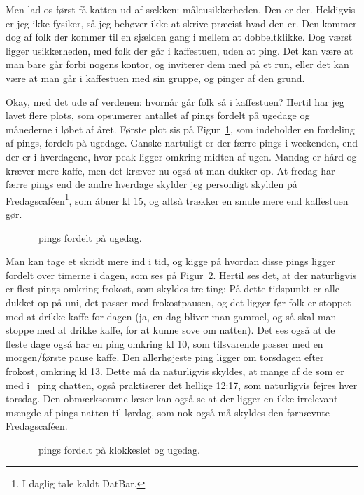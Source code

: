\documentclass{article}
\newlength\myheight
\newlength\mydepth
\newcommand*\inlinegraphics[1]{%
  \settototalheight\myheight{Xygp}%
  \settodepth\mydepth{Xygp}%
  \raisebox{-\mydepth}{\texttt{[image: \#1]}}%
}
\newcommand{\coffee}[0]{\inlinegraphics{coffee.png}}
\begin{document}
Men lad os først få katten ud af sækken: måleusikkerheden. Den er der. Heldigvis er jeg ikke fysiker, så jeg behøver ikke at skrive præcist hvad den er. Den kommer dog af folk der kommer til en sjælden gang i mellem at dobbeltklikke. Dog værst ligger usikkerheden, med folk der går i kaffestuen, uden at ping. Det kan være at man bare går forbi nogens kontor, og inviterer dem med på et run, eller det kan være at man går i kaffestuen med sin gruppe, og pinger af den grund.

Okay, med det ude af verdenen: hvornår går folk så i kaffestuen? Hertil har jeg lavet flere plots, som opsumerer antallet af pings fordelt på ugedage og månederne i løbet af året.
Første plot sis på Figur~\ref{fig:0}, som indeholder en fordeling af pings, fordelt på ugedage. Ganske nartuligt er der færre pings i weekenden, end der er i hverdagene, hvor peak ligger omkring midten af ugen. Mandag er hård og kræver mere kaffe, men det kræver nu også at man dukker op. At fredag har færre pings end de andre hverdage skylder jeg personligt skylden på Fredagscaféen\footnote{I daglig tale kaldt DatBar.}, som åbner kl 15, og altså trækker en smule mere end kaffestuen gør.

\begin{figure}
	\centering
	\resizebox{\textwidth}{!}{}
	\vspace{-25pt}
	\caption{\protect\coffee\ pings fordelt på ugedag.}
	\label{fig:0}
\end{figure}

Man kan tage et skridt mere ind i tid, og kigge på hvordan disse pings ligger fordelt over timerne i dagen, som ses på Figur~\ref{fig:1}. Hertil ses det, at der naturligvis er flest pings omkring frokost, som skyldes tre ting: På dette tidspunkt er alle dukket op på uni, det passer med frokostpausen, og det ligger før folk er stoppet med at drikke kaffe for dagen (ja, en dag bliver man gammel, og så skal man stoppe med at drikke kaffe, for at kunne sove om natten). Det ses også at de fleste dage også har en ping omkring kl 10, som tilsvarende passer med en morgen/første pause kaffe. Den allerhøjeste ping ligger om torsdagen efter frokost, omkring kl 13. Dette må da naturligvis skyldes, at mange af de som er med i \coffee\ ping chatten, også praktiserer det hellige 12:17\texttrademark, som naturligvis fejres hver torsdag. Den obmærksomme læser kan også se at der ligger en ikke irrelevant mængde af pings natten til lørdag, som nok også må skyldes den førnævnte Fredagscaféen.

\begin{figure}
	\centering
	\resizebox{\textwidth}{!}{}
	\vspace{-25pt}
	\caption{\protect\coffee\ pings fordelt på klokkeslet og ugedag.}
	\label{fig:1}
\end{figure}
\end{document}
